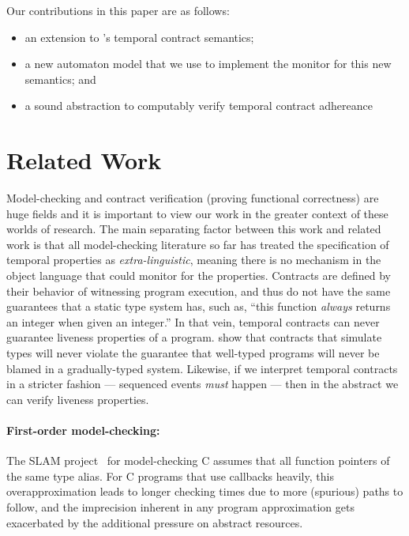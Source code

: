 \documentclass[preprint,onecolumn,9pt]{sigplanconf} %
\begin{document}
Our contributions in this paper are as follows:
\begin{itemize}
 \item{an extension to \citeauthor{ianjohnson:dfm:icfp2011}'s temporal contract semantics;}
 \item{a new automaton model that we use to implement the monitor for this new semantics; and}
 \item{a sound abstraction to computably verify temporal contract adhereance}
\end{itemize}

\section{Related Work}

Model-checking and contract verification (proving functional correctness) are huge fields and it is important to view our work in the greater context of these worlds of research.
%
The main separating factor between this work and related work is that all model-checking literature so far has treated the specification of temporal properties as \emph{extra-linguistic}, meaning there is no mechanism in the object language that could monitor for the properties.
%
Contracts are defined by their behavior of witnessing program execution, and thus do not have the same guarantees that a static type system has, such as, ``this function \emph{always} returns an integer when given an integer.''
%
In that vein, temporal contracts can never guarantee liveness properties of a program.
%
\citet{ianjohnson:dthf:complete} show that contracts that simulate types will never violate the guarantee that well-typed programs will never be blamed in a gradually-typed system.
%
Likewise, if we interpret temporal contracts in a stricter fashion --- sequenced events \emph{must} happen --- then in the abstract we can verify liveness properties.

\paragraph{First-order model-checking:}
The SLAM project~\citep{ianjohnson:Ball:2002:SLP:503272.503274} for model-checking C assumes that all function pointers of the same type alias.
%
For C programs that use callbacks heavily, this overapproximation leads to longer checking times due to more (spurious) paths to follow, and the imprecision inherent in any program approximation gets exacerbated by the additional pressure on abstract resources.
\end{document}
